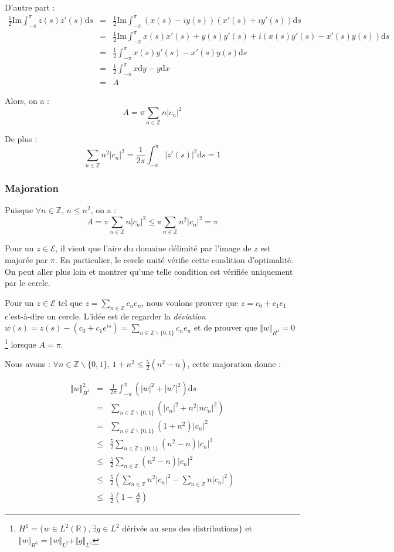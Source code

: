 \documentclass[10pt,a4paper]{article}
\newcommand{\R}{\mathbb{R}}
\newcommand{\Z}{\mathbb{Z}}
\renewcommand{\d}{\mathrm{d}}
\renewcommand{\Im}{\mathrm{Im}}
\theoremstyle{plain}
\theoremstyle{definition}
\begin{document}
D'autre part :
\begin{eqnarray*}
\frac{1}{2} \Im \int_{-\pi}^{\pi}{\bar{z}(s) z'(s) \d s} &=& \frac{1}{2} \Im \int_{-\pi}^{\pi}{(x(s)-iy(s)) (x'(s)+iy'(s)) \d s} \\
&=& \frac{1}{2} \Im \int_{-\pi}^{\pi}{x(s)x'(s)+y(s)y'(s) + i(x(s)y'(s)-x'(s)y(s)) \d s} \\
&=& \frac{1}{2} \int_{-\pi}^{\pi}{x(s)y'(s)-x'(s)y(s) \d s} \\
&=& \frac{1}{2} \int_{-\pi}^{\pi}{x\d y-y\d x} \\
&=& A
\end{eqnarray*}

Alors, on a :
\[ A =  \pi \sum_{n\in \Z}{ n |c_n|^2} \]

De plus :
\[ \sum_{n\in \Z}{n^2|c_n|^2} = \frac{1}{2\pi} \int_{-\pi}^{\pi}{|z'(s)|^2\d s} = 1 \]

\subsubsection{Majoration}

Puisque $\forall n \in \Z$, $n \leqslant n^2$, on a :
\[ A = \pi \sum_{n\in \Z}{n|c_n|^2} \leqslant \pi \sum_{n\in \Z}{n^2|c_n|^2} = \pi  \]

Pour un $z \in \mathcal{E}$, il vient que l'aire du domaine délimité par l'image de $z$ est majorée par $\pi$. En particulier, le cercle unité vérifie cette condition d'optimalité. On peut aller plus loin et montrer qu'une telle condition est vérifiée uniquement par le cercle.


Pour un $z \in \mathcal{E}$ tel que $z=\sum_{n\in \Z}{c_ne_n}$, nous voulons prouver que $z = c_0 + c_1 e_1$ c'est-à-dire un cercle. L'idée est de regarder la \emph{déviation} $w(s) = z(s) - (c_0+c_1e^{is}) = \sum_{n\in \Z\backslash \{0,1\}}{c_ne_n}$ et de prouver que $\Vert w\Vert_{H^1} = 0$ \footnote{$H^1 = \{ w \in L^2(\R), \exists g \in L^2\text{ dérivée au sens des distributions} \}$ et $\Vert w \Vert_{H^1} = \Vert w \Vert_{L^2} + \Vert g \Vert_{L^2}$} lorsque $A=\pi$.

Nous avons : $\forall n \in \Z \backslash \{0,1\}$, $1+n^2 \leqslant \frac{5}{2} (n^2-n)$, cette majoration donne :

\begin{eqnarray*}
\Vert w\Vert_{H^1}^2 &=& \frac{1}{2\pi} \int_{-\pi}^{\pi}{ (|w|^2+|w'|^2)\d s} \\
&=& \sum_{n\in \Z\backslash \{0,1\}}{(|c_n|^2+ n^2|nc_n|^2)} \\
&=& \sum_{n\in \Z\backslash \{0,1\}}{(1+n^2) |c_n|^2 } \\
&\leqslant& \frac{5}{2} \sum_{n\in \Z\backslash \{0,1\}}{(n^2-n) |c_n|^2 } \\
&\leqslant& \frac{5}{2} \sum_{n\in \Z}{(n^2-n) |c_n|^2 } \\
&\leqslant& \frac{5}{2} \left(\sum_{n\in \Z}{n^2|c_n|^2} - \sum_{n\in \Z}{n|c_n|^2 } \right) \\
&\leqslant& \frac{5}{2} \left(1 - \frac{A}{\pi}\right)
\end{eqnarray*}
\end{document}
